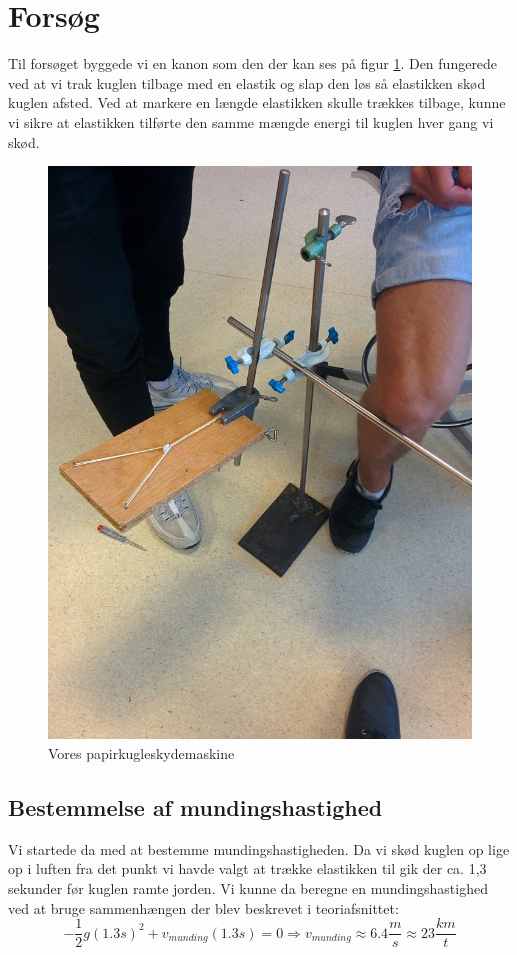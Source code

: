 \documentclass[12pt,a4paper]{article}
\theoremstyle{break}
\theoremstyle{nonumberplain}
\begin{document}
\section{Forsøg}
Til forsøget byggede vi en kanon som den der kan ses på figur \ref{maskine}. 
Den fungerede ved at vi trak kuglen tilbage med en elastik og slap den løs så elastikken skød kuglen afsted. 
Ved at markere en længde elastikken skulle trækkes tilbage, kunne vi sikre at elastikken tilførte den samme mængde energi til kuglen hver gang vi skød. 

\begin{figure}
\center
\includegraphics[scale=0.2]{papirkuglekastemaskine}
\caption{Vores papirkugleskydemaskine}
\label{maskine}
\end{figure}

\subsection{Bestemmelse af mundingshastighed}
Vi startede da med at bestemme mundingshastigheden. 
Da vi skød kuglen op lige op i luften fra det punkt vi havde valgt at trække elastikken til gik der ca. 1,3 sekunder før kuglen ramte jorden. 
Vi kunne da beregne en mundingshastighed ved at bruge sammenhængen der blev beskrevet i teoriafsnittet:
$$-\frac{1}{2}g(1.3s)^2 + v_{munding}(1.3 s)=0 \Rightarrow v_{munding}\approx6.4 \frac{m}{s}\approx 23 \frac{km}{t}$$
\end{document}
